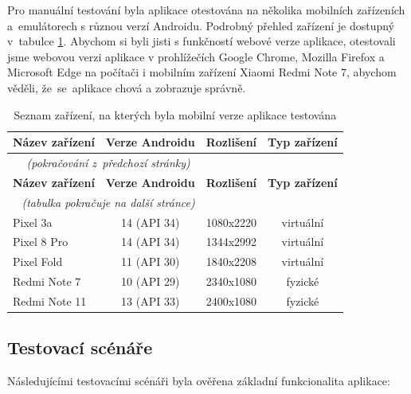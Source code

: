 \documentclass[czech, bc, kiv, he, iso690numb]{fasthesis}
\begin{document}
Pro manuální testování byla aplikace otestována na několika mobilních zařízeních a~emulátorech s různou verzí Androidu. Podrobný přehled zařízení je dostupný v~tabulce \ref{tab:devices}. Abychom si byli jisti s funkčností webové verze aplikace, otestovali jsme webovou verzi aplikace v prohlížečích Google Chrome, Mozilla Firefox a Microsoft Edge na počítači i mobilním zařízení Xiaomi Redmi Note 7, abychom věděli, že~se~aplikace chová a zobrazuje správně. 


\begin{center}
\begin{longtable}{lccc}
\caption{Seznam zařízení, na kterých byla mobilní verze aplikace testována}
\label{tab:devices}\\
\toprule[1.5pt]
\textbf{Název zařízení} & \textbf{Verze Androidu} & \textbf{Rozlišení} &  \textbf{Typ zařízení}\\
\midrule
\endfirsthead
\multicolumn{2}{c}{\tablename{}~\thetable{}
    \textit{(pokračování z~předchozí stránky)}}\\
\midrule
\textbf{Název zařízení} & \textbf{Verze Androidu} & \textbf{Rozlišení} &  \textbf{Typ zařízení}\\
\midrule
\endhead
\midrule
\multicolumn{2}{r}{%
    \textit{(tabulka pokračuje na další stránce)}}\\
\endfoot
\bottomrule[1.5pt]
\endlastfoot
Pixel 3a & 14 (\gls{API} 34) & 1080x2220 & virtuální \\ \hline
Pixel 8 Pro & 14 (\gls{API} 34) & 1344x2992 & virtuální \\ \hline
Pixel Fold & 11 (\gls{API} 30) & 1840x2208 & virtuální\\ \hline
Redmi Note 7 & 10 (\gls{API} 29) & 2340x1080 & fyzické \\ \hline
Redmi Note 11 & 13 (\gls{API} 33) & 2400x1080 & fyzické \\ \hline
\end{longtable}
\end{center}

\subsection{Testovací scénáře}

Následujícími testovacími scénáři byla ověřena základní funkcionalita aplikace:

\vspace{0.1cm}

\end{document}
